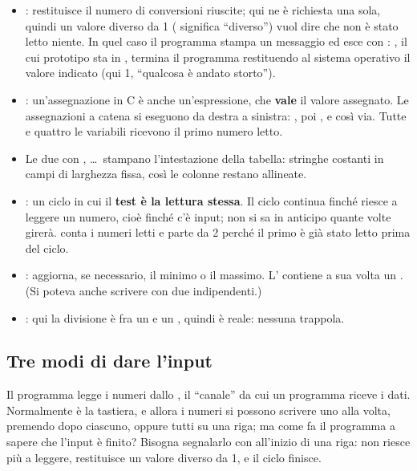 \begin{itemize}
  \item {}:  restituisce il
        numero di conversioni riuscite; qui ne è richiesta una sola, quindi
        un valore diverso da 1 (\code{!=} significa “diverso”) vuol dire
        che non è stato letto niente. In quel caso il programma stampa un
        messaggio ed esce con : , il cui prototipo
        sta in , termina il programma restituendo al sistema
        operativo il valore indicato (qui 1, “qualcosa è andato storto”).
  \item {}: un'assegnazione in C è anche
        un'espressione, che \textbf{vale} il valore assegnato. Le
        assegnazioni a catena si eseguono da destra a sinistra:
        , poi , e così via. Tutte e
        quattro le variabili ricevono il primo numero letto.
  \item Le due  con , \dots\ stampano
        l'intestazione della tabella: stringhe costanti in campi di
        larghezza fissa, così le colonne restano allineate.
  \item {}: un ciclo 
        in cui il \textbf{test è la lettura stessa}. Il ciclo continua finché
         riesce a leggere un numero, cioè finché c'è input; non
        si sa in anticipo quante volte girerà.  conta i numeri letti
        e parte da 2 perché il primo è già stato letto prima del ciclo.
  \item {}: aggiorna, se
        necessario, il minimo o il massimo. L' contiene a sua
        volta un . (Si poteva anche scrivere con due 
        indipendenti.)
  \item {}: qui la divisione è fra un  e un
        , quindi è reale: nessuna trappola.
\end{itemize}

\subsection{Tre modi di dare l'input}

Il programma legge i numeri dallo , il “canale” da cui
un programma riceve i dati. Normalmente è la tastiera, e allora i numeri si
possono scrivere uno alla volta, premendo  dopo ciascuno, oppure
tutti su una riga; ma come fa il programma a sapere che l'input è finito?
Bisogna segnalarlo con  all'inizio di una riga: 
non riesce più a leggere, restituisce un valore diverso da 1, e il ciclo
finisce.

